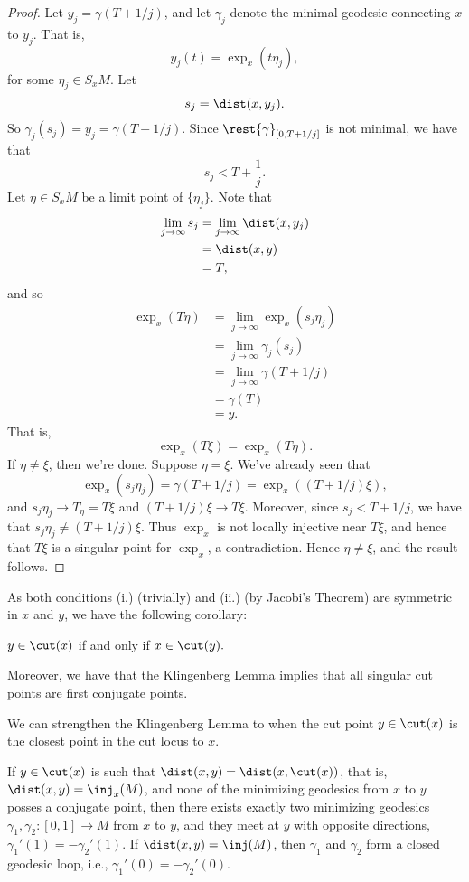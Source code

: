\begin{proof}
Let $y_j=\gamma(T+1/j)$, and let $\gamma_j$ denote the minimal geodesic connecting $x$ to $y_j$.  That is,
$$y_j(t)=\exp_x(t\eta_j),$$
for some $\eta_j\in S_xM$.  Let
$$s_j=\dist(x,y_j).$$
So $\gamma_j(s_j)=y_j=\gamma(T+1/j)$.  Since $\rest{\gamma}_{[0,T+1/j]}$ is not minimal, we have that
$$s_j<T+\frac{1}{j}.$$
Let $\eta\in S_xM$ be a limit point of $\{\eta_j\}$.  Note that
\begin{align*}
	\lim_{j\to\infty}s_j&=\lim_{j\to\infty}\dist(x,y_j)\\
	&=\dist(x,y)\\
	&=T,
\end{align*}
and so
\begin{align*}
	\exp_x(T\eta)&=\lim_{j\to\infty}\exp_x(s_j\eta_j)\\
	&=\lim_{j\to\infty}\gamma_j(s_j)\\
	&=\lim_{j\to\infty}\gamma(T+1/j)\\
	&=\gamma(T)\\
	&=y.
\end{align*}
That is,
$$\exp_x(T\xi)=\exp_x(T\eta).$$
If $\eta\neq\xi$, then we're done.  Suppose $\eta=\xi$.  We've already seen that
$$\exp_x(s_j\eta_j)=\gamma(T+1/j)=\exp_x((T+1/j)\xi),$$
and $s_j\eta_j\to T_\eta=T\xi$ and $(T+1/j)\xi\to T\xi$.  Moreover, since $s_j<T+1/j$, we have that $s_j\eta_j\neq (T+1/j)\xi$.  Thus $\exp_x$ is not locally injective near $T\xi$, and hence that $T\xi$ is a singular point for $\exp_x$, a contradiction.  Hence $\eta\neq\xi$, and the result follows.
\end{proof}

As both conditions (i.) (trivially) and (ii.) (by Jacobi's Theorem) are symmetric in $x$ and $y$, we have the following corollary:

\begin{cor}
    $y\in\cut(x)$ if and only if $x\in\cut(y).$
\end{cor}

Moreover, we have that the Klingenberg Lemma implies that all singular cut points are first conjugate points.

We can strengthen the Klingenberg Lemma to when the cut point $y\in\cut(x)$ is the closest point in the cut locus to $x$.

\begin{thm}\label{thm:klingTheorem}
  If $y\in\cut(x)$ is such that $\dist(x,y)=\dist(x,\cut(x))$, that is, $\dist(x,y)=\inj_x(M)$, and none of the minimizing geodesics from $x$ to $y$ posses a conjugate point, then there exists exactly two minimizing geodesics $\gamma_1,\gamma_2:[0,1]\to M$  from $x$ to $y$, and they meet at $y$ with opposite directions, $\gamma_1'(1)=-\gamma_2'(1)$.  If $\dist(x,y)=\inj(M)$, then $\gamma_1$ and $\gamma_2$ form a closed geodesic loop, i.e., $\gamma_1'(0)=-\gamma_2'(0)$.	  
\end{thm}

